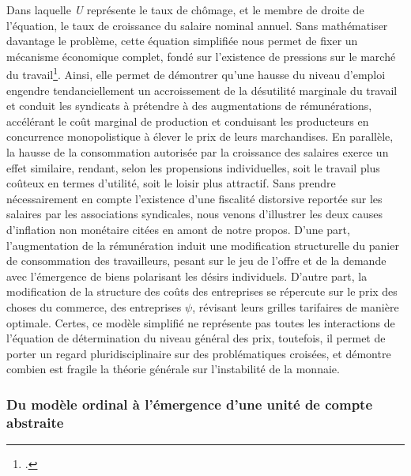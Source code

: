{Dans laquelle \emph{U} représente le taux de chômage, et le membre de droite de l'équation, le taux de croissance du salaire nominal annuel. Sans mathématiser davantage le problème, cette équation simplifiée nous permet de fixer un mécanisme économique complet, fondé sur l'existence de pressions sur le marché du travail\footnote{.}. Ainsi, elle permet de démontrer qu'une hausse du niveau d'emploi engendre tendanciellement un accroissement de la \gls{désutilité marginale du travail} et conduit les syndicats à prétendre à des augmentations de rémunérations, accélérant le coût marginal de production et conduisant les producteurs en concurrence monopolistique à élever le prix de leurs marchandises. En parallèle, la hausse de la consommation autorisée par la croissance des salaires exerce un effet similaire, rendant, selon les propensions individuelles, soit le travail plus coûteux en termes d'utilité, soit le loisir plus attractif. Sans prendre nécessairement en compte l'existence d'une fiscalité distorsive reportée sur les salaires par les associations syndicales, nous venons d'illustrer les deux causes d'inflation non monétaire citées en amont de notre propos. D'une part, l'augmentation de la rémunération induit une modification structurelle du panier de consommation des travailleurs, pesant sur le jeu de l'offre et de la demande avec l'émergence de biens polarisant les désirs individuels. D'autre part, la modification de la structure des coûts des entreprises se répercute sur le prix des choses du commerce, des entreprises $\psi$, révisant leurs grilles tarifaires de manière optimale. Certes, ce modèle simplifié ne représente pas toutes les interactions de l'équation de détermination du niveau général des prix, toutefois, il permet de porter un regard pluridisciplinaire sur des problématiques croisées, et démontre combien est fragile la théorie générale sur l'instabilité de la monnaie.\par
	
\subsubsection{Du modèle ordinal à l'émergence d'une unité de compte abstraite}

}
